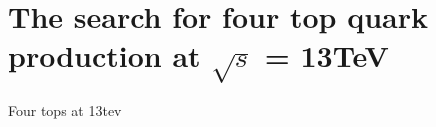 \chapter{The search for four top quark production at $\sqrt{s}$ = 13TeV}
\label{c:Run2}
Four tops at 13tev
